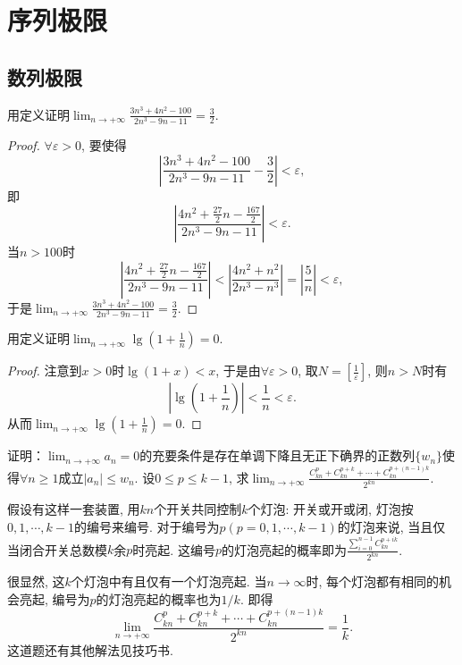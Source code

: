 \chapter{序列极限}
\section{数列极限}
\begin{quiza}
\woe  用定义证明\(\lim_{n\rightarrow +\infty}\frac{3n^3+4n^2-100}{2n^3-9n-11}=\frac{3}{2}.\)
\begin{proof}
\(\forall \varepsilon >0\), 要使得\[\left|\frac{3n^3+4n^2-100}{2n^3-9n-11}-\frac{3}{2}\right|<\varepsilon,\]即\[\left|\frac{4n^2+\frac{27}{2}n-\frac{167}{2}}{2n^3-9n-11}\right|<\varepsilon.\]当\(n>100\)时\[\left|\frac{4n^2+\frac{27}{2}n-\frac{167}{2}}{2n^3-9n-11}\right|<\left|\frac{4n^2+n^2}{2n^3-n^3}\right|=\left|\frac{5}{n}\right|<\varepsilon,\]于是\(\lim_{n\rightarrow +\infty}\frac{3n^3+4n^2-100}{2n^3-9n-11}=\frac{3}{2}.\)
\end{proof}
\woe 用定义证明\(\lim_{n\rightarrow +\infty}\lg \left(1+\frac{1}{n}\right)=0.\)
\begin{proof}
注意到\(x>0\)时\(\lg(1+x)<x\), 于是由\(\forall \varepsilon>0\), 取\(N=\left[\frac{1}{\varepsilon}\right]\), 则\(n>N\)时有\[\left|\lg\left(1+\frac{1}{n}\right)\right|<\frac{1}{n}<\varepsilon.\]从而\(\lim_{n\rightarrow +\infty}\lg \left(1+\frac{1}{n}\right)=0.\)
\end{proof}
\end{quiza}
\begin{quizb}
\woe 证明：\(\lim_{n\rightarrow +\infty}a_n=0\)的充要条件是存在单调下降且无正下确界的正数列\(\{w_n\}\)使得\(\forall n\geqslant 1\)成立\(\left|a_n\right|\leqslant w_n\).
\woe 设\(0\leqslant p\leqslant k-1\), 求\( \lim_{n\rightarrow +\infty}\frac{C_{kn}^{p}+C_{kn}^{p+k}+\cdots+C_{kn}^{p+(n-1)k}}{2^{kn}}\).
\begin{solution}
假设有这样一套装置, 用\(kn\)个开关共同控制\(k\)个灯泡: 开关或开或闭, 灯泡按\(0,1,\cdots,k-1\)的编号来编号. 对于编号为\(p(p=0,1,\cdots,k-1)\)的灯泡来说, 当且仅当闭合开关总数模\(k\)余\(p\)时亮起. 这编号\(p\)的灯泡亮起的概率即为\(\frac{\displaystyle\sum_{i=0}^{n-1}C_{kn}^{p+ik}}{2^{kn}}\).

很显然, 这\(k\)个灯泡中有且仅有一个灯泡亮起. 当\(n\rightarrow\infty\)时, 每个灯泡都有相同的机会亮起, 编号为\(p\)的灯泡亮起的概率也为\(1/k\). 即得\[\lim_{n\rightarrow +\infty}\frac{C_{kn}^{p}+C_{kn}^{p+k}+\cdots+C_{kn}^{p+(n-1)k}}{2^{kn}}=\frac{1}{k}.\]这道题还有其他解法见技巧书.
\end{solution}
\end{quizb}
